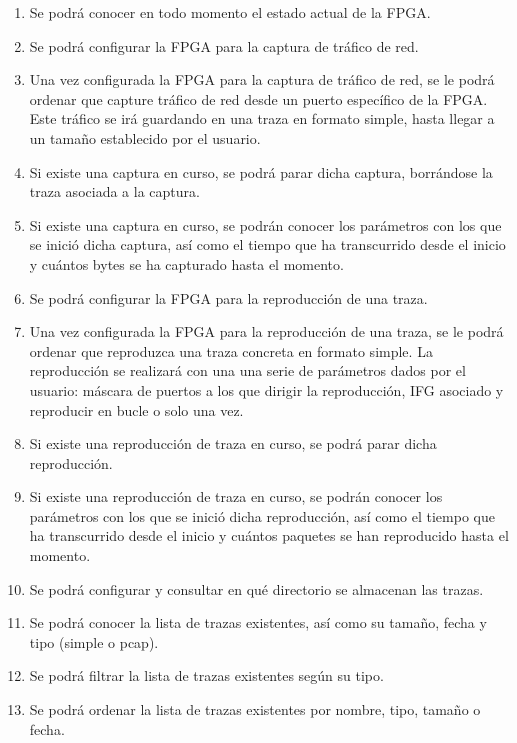 \begin{enumerate}[align=left,before=\itshape,font=\normalfont,label=\bfseries RF. \arabic*]
  \item Se podrá conocer en todo momento el estado actual de la \gls{FPGA}.
  \item Se podrá configurar la \gls{FPGA} para la captura de tráfico de red.
  \item Una vez configurada la \gls{FPGA} para la captura de tráfico de red, se le podrá ordenar que capture tráfico de red desde un puerto específico de la \gls{FPGA}.
  Este tráfico se irá guardando en una \gls{traza} en formato \gls{simple}, hasta llegar a un tamaño establecido por el usuario.
  \item Si existe una captura en curso, se podrá parar dicha captura, borrándose la \gls{traza} asociada a la captura.
  \item Si existe una captura en curso, se podrán conocer los parámetros con los que se inició dicha captura, así como el tiempo que ha transcurrido desde el inicio y cuántos bytes se ha capturado hasta el momento.
  \item Se podrá configurar la \gls{FPGA} para la reproducción de una \gls{traza}.
  \item Una vez configurada la \gls{FPGA} para la reproducción de una \gls{traza}, se le podrá ordenar que reproduzca una \gls{traza} concreta en formato \gls{simple}.
  La reproducción se realizará con una una serie de parámetros dados por el usuario: máscara de puertos a los que dirigir la reproducción, \gls{IFG} asociado y reproducir en bucle o solo una vez.
  \item Si existe una reproducción de \gls{traza} en curso, se podrá parar dicha reproducción.
  \item Si existe una reproducción de \gls{traza} en curso, se podrán conocer los parámetros con los que se inició dicha reproducción, así como el tiempo que ha transcurrido desde el inicio y cuántos paquetes se han reproducido hasta el momento.
  \item Se podrá configurar y consultar en qué directorio se almacenan las \glspl{traza}.
  \item Se podrá conocer la lista de \glspl{traza} existentes, así como su tamaño, fecha y tipo (\gls{simple} o \gls{pcap}).
  \item Se podrá filtrar la lista de \glspl{traza} existentes según su tipo.
  \item Se podrá ordenar la lista de \glspl{traza} existentes por nombre, tipo, tamaño o fecha.

\end{enumerate}
